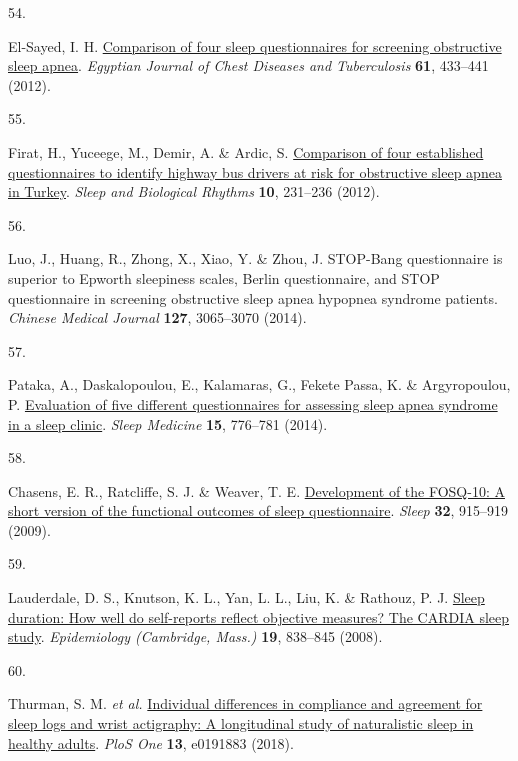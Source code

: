 \documentclass[
  10pt,
]{scrbook}
\newlength{\cslhangindent}
\newlength{\csllabelwidth}
\newlength{\cslentryspacingunit} %
\newenvironment{CSLReferences}[2] %
 {%
  \setlength{\parindent}{0pt}
  \ifodd #1
  \let\oldpar\par
  \def\par{\hangindent=\cslhangindent\oldpar}
  \fi
  \setlength{\parskip}{#2\cslentryspacingunit}
 }%
 {}
\newcommand{\CSLLeftMargin}[1]{\parbox[t]{\csllabelwidth}{#1}}
\newcommand{\CSLRightInline}[1]{\parbox[t]{\linewidth - \csllabelwidth}{#1}\break}
\let\originaltextbf\textbf
\renewcommand{\textbf}[1]{\textcolor{color1}{\textsf{\originaltextbf{#1}}}}
\begin{document}
\begin{CSLReferences}{0}{0}
\leavevmode{}%
\CSLLeftMargin{54. }%
\CSLRightInline{El-Sayed, I. H.
\href{https://doi.org/10.1016/j.ejcdt.2012.07.003}{Comparison of four
sleep questionnaires for screening obstructive sleep apnea}.
\emph{Egyptian Journal of Chest Diseases and Tuberculosis} \textbf{61},
433--441 (2012).}

\leavevmode{}%
\CSLLeftMargin{55. }%
\CSLRightInline{Firat, H., Yuceege, M., Demir, A. \& Ardic, S.
\href{https://doi.org/10.1111/j.1479-8425.2012.00566.x}{Comparison of
four established questionnaires to identify highway bus drivers at risk
for obstructive sleep apnea in Turkey}. \emph{Sleep and Biological
Rhythms} \textbf{10}, 231--236 (2012).}

\leavevmode{}%
\CSLLeftMargin{56. }%
\CSLRightInline{Luo, J., Huang, R., Zhong, X., Xiao, Y. \& Zhou, J.
STOP-Bang questionnaire is superior to Epworth sleepiness scales, Berlin
questionnaire, and STOP questionnaire in screening obstructive sleep
apnea hypopnea syndrome patients. \emph{Chinese Medical Journal}
\textbf{127}, 3065--3070 (2014).}

\leavevmode{}%
\CSLLeftMargin{57. }%
\CSLRightInline{Pataka, A., Daskalopoulou, E., Kalamaras, G., Fekete
Passa, K. \& Argyropoulou, P.
\href{https://doi.org/10.1016/j.sleep.2014.03.012}{Evaluation of five
different questionnaires for assessing sleep apnea syndrome in a sleep
clinic}. \emph{Sleep Medicine} \textbf{15}, 776--781 (2014).}

\leavevmode{}%
\CSLLeftMargin{58. }%
\CSLRightInline{Chasens, E. R., Ratcliffe, S. J. \& Weaver, T. E.
\href{https://doi.org/10.1093/sleep/32.7.915}{Development of the
FOSQ-10: A short version of the functional outcomes of sleep
questionnaire}. \emph{Sleep} \textbf{32}, 915--919 (2009).}

\leavevmode{}%
\CSLLeftMargin{59. }%
\CSLRightInline{Lauderdale, D. S., Knutson, K. L., Yan, L. L., Liu, K.
\& Rathouz, P. J.
\href{https://doi.org/10.1097/EDE.0b013e318187a7b0}{Sleep duration: How
well do self-reports reflect objective measures? The CARDIA sleep
study}. \emph{Epidemiology (Cambridge, Mass.)} \textbf{19}, 838--845
(2008).}

\leavevmode{}%
\CSLLeftMargin{60. }%
\CSLRightInline{Thurman, S. M. \emph{et al.}
\href{https://doi.org/10.1371/journal.pone.0191883}{Individual
differences in compliance and agreement for sleep logs and wrist
actigraphy: A longitudinal study of naturalistic sleep in healthy
adults}. \emph{PloS One} \textbf{13}, e0191883 (2018).}


\end{CSLReferences}
\end{document}
